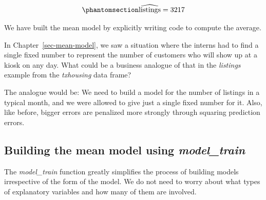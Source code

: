 \documentclass[
  12pt,
  letterpaper,
  DIV=11,
  numbers=noendperiod]{scrreprt}
\begin{document}
\begin{equation}\phantomsection\label{eq-txhousing-listings-mean-model}{
\widehat{\text{listings}} = 3217
}\end{equation}

We have built the mean model by explicitly writing code to compute the
average.

\begin{tcolorbox}[enhanced jigsaw, colback=white, leftrule=.75mm, toprule=.15mm, bottomtitle=1mm, breakable, coltitle=black, toptitle=1mm, title={Quick Check}, opacitybacktitle=0.6, colbacktitle=quarto-callout-note-color!10!white, arc=.35mm, left=2mm, colframe=quarto-callout-note-color-frame, titlerule=0mm, rightrule=.15mm, bottomrule=.15mm, opacityback=0]

In Chapter~\ref{sec-mean-model}, we saw a situation where the interns
had to find a single fixed number to represent the number of customers
who will show up at a kiosk on any day. What could be a business
analogue of that in the \emph{listings} example from the
\emph{txhousing} data frame?

\end{tcolorbox}

\begin{tcolorbox}[enhanced jigsaw, colback=white, leftrule=.75mm, toprule=.15mm, bottomtitle=1mm, breakable, coltitle=black, toptitle=1mm, title={Suggested answer}, opacitybacktitle=0.6, colbacktitle=quarto-callout-note-color!10!white, arc=.35mm, left=2mm, colframe=quarto-callout-note-color-frame, titlerule=0mm, rightrule=.15mm, bottomrule=.15mm, opacityback=0]

The analogue would be: We need to build a model for the number of
listings in a typical month, and we were allowed to give just a single
fixed number for it. Also, like before, bigger errors are penalized more
strongly through squaring prediction errors.

\end{tcolorbox}

\subsection{\texorpdfstring{Building the mean model using
\emph{model\_train}}{Building the mean model using model\_train}}\label{building-the-mean-model-using-model_train}

The \emph{model\_train} function greatly simplifies the process of
building models irrespective of the form of the model. We do not need to
worry about what types of explanatory variables and how many of them are
involved.
\end{document}
